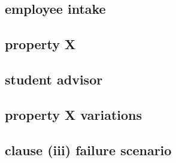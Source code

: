 \documentclass[10pt,a4paper]{article}
\begin{document}
\subsection{employee intake}


\subsection{property X}


\subsection{student advisor}


\subsection{property X variations}


\subsection{clause (iii) failure scenario}

\end{document}
